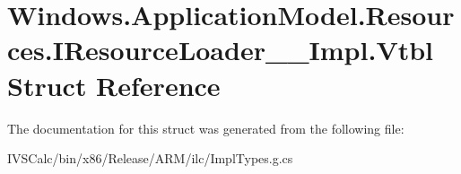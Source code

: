 \hypertarget{struct_windows_1_1_application_model_1_1_resources_1_1_i_resource_loader_____impl_1_1_vtbl}{}\section{Windows.\+Application\+Model.\+Resources.\+I\+Resource\+Loader\+\_\+\+\_\+\+Impl.\+Vtbl Struct Reference}
\label{struct_windows_1_1_application_model_1_1_resources_1_1_i_resource_loader_____impl_1_1_vtbl}


The documentation for this struct was generated from the following file\+:\begin{DoxyCompactItemize}
\item 
I\+V\+S\+Calc/bin/x86/\+Release/\+A\+R\+M/ilc/Impl\+Types.\+g.\+cs\end{DoxyCompactItemize}
